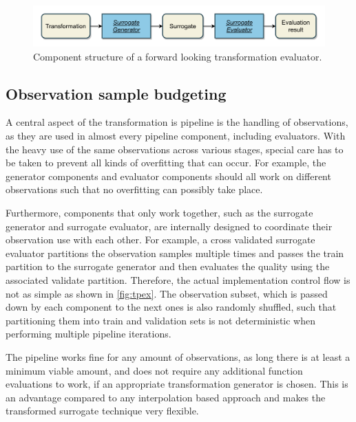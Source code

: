 \documentclass[
  a4paper,  %
  twoside,  %
  bibliography=totoc,
  headsepline,
  cleardoublepage=empty,
  parskip=half,
  draft=false
]{scrbook}
\begin{document}
\begin{mdframed}[style=style,frametitle={Transformation evaluator (forward looking)}]
\begin{figure}[H]
\includegraphics[width=\textwidth]{graphics/TransformationEval.pdf}
\delimit
\caption{Component structure of a forward looking transformation evaluator.}
\label{fig:te}
\end{figure}
\end{mdframed}


\subsection{Observation sample budgeting}

A central aspect of the transformation is pipeline is the handling of observations, as they are used in almost every pipeline component, including evaluators.
With the heavy use of the same observations across various stages, special care has to be taken to prevent all kinds of overfitting that can occur.
For example, the generator components and evaluator components should all work on different observations such that no overfitting can possibly take place.

Furthermore, components that only work together, such as the surrogate generator and surrogate evaluator, are internally designed to coordinate their observation use with each other.
For example, a cross validated surrogate evaluator partitions the observation samples multiple times and passes the train partition to the surrogate generator and then evaluates the quality using the associated validate partition.
Therefore, the actual implementation control flow is not as simple as shown in \cref{fig:tpex}.
The observation subset, which is passed down by each component to the next ones is also randomly shuffled, such that partitioning them into train and validation sets is not deterministic when performing multiple pipeline iterations.

The pipeline works fine for any amount of observations, as long there is at least a minimum viable amount, and does not require any additional function evaluations to work, if an appropriate transformation generator is chosen.
This is an advantage compared to any interpolation based approach and makes the transformed surrogate technique very flexible.
\end{document}
